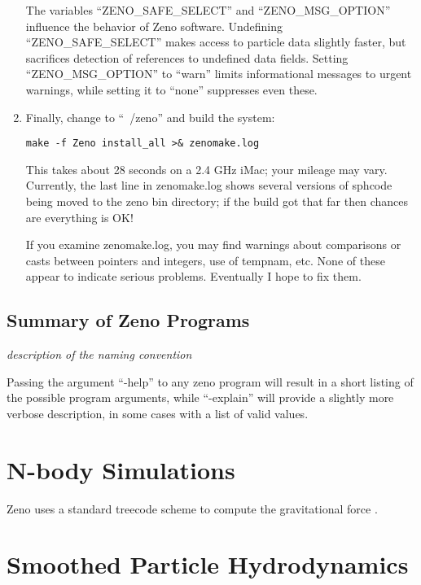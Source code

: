 \documentclass[11pt,letterpaper]{article}
\begin{document}
\begin{enumerate}
{The variables ``ZENO\_SAFE\_SELECT'' and ``ZENO\_MSG\_OPTION'' influence the behavior of Zeno software.  Undefining ``ZENO\_SAFE\_SELECT'' makes access to particle data slightly faster, but sacrifices detection of references to undefined data fields.  Setting ``ZENO\_MSG\_OPTION'' to ``warn'' limits informational messages to urgent warnings, while setting it to ``none'' suppresses even these.}
\item{Finally, change to ``~/zeno'' and build the system:
\begin{verbatim}
make -f Zeno install_all >& zenomake.log
\end{verbatim}
This takes about 28 seconds on a 2.4 GHz iMac; your mileage may vary.  Currently, the last line in zenomake.log shows several versions of sphcode being moved to the zeno bin directory; if the build got that far then chances are everything is OK!

If you examine zenomake.log, you may find warnings about comparisons or casts between pointers and integers, use of tempnam, etc.  None of these appear to indicate serious problems.  Eventually I hope to fix them.}
\end{enumerate}

\subsection{Summary of Zeno Programs}
\label{ssec:programs}

\emph{description of the naming convention}

Passing the argument ``-help'' to any zeno program will result in a short listing of the possible program arguments, while ``-explain'' will provide a slightly more verbose description, in some cases with a list of valid values.

\section{N-body Simulations}
\label{sec:Nbody}

Zeno uses a standard treecode scheme to compute the gravitational force \citep{Barnes1986}. 

\section{Smoothed Particle Hydrodynamics}
\label{sec:SPH}
\end{document}
